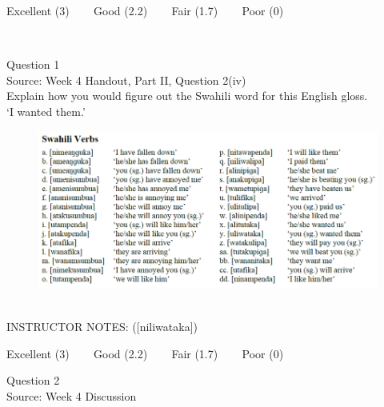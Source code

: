 \documentclass[12pt]{article}
\begin{document}
\vfill
Excellent (3) ~~~ Good (2.2) ~~~ Fair (1.7) ~~~ Poor (0)
\newpage

\begin{center}
\textbf{{\color{red}{\HUGE END OF EXAM}}}\\

\end{center}
\newpage

\begin{center}
\textbf{{\color{blue}{\HUGE START OF EXAM\\}}}

\textbf{{\color{blue}{\HUGE Student ID: 23000\\}}}

\textbf{{\color{blue}{\HUGE 9:20\\}}}

\end{center}
\newpage

{\large Question 1}\\

Source: Week 4 Handout, Part II, Question 2(iv)\\

Explain how you would figure out the Swahili word for this English gloss.\\

‘I wanted them.’

\begin{figure}[H]
\includegraphics{../images/swahiliverbs.png}
\end{figure}

~\\
INSTRUCTOR NOTES: ([niliwataka])


\vfill
Excellent (3) ~~~ Good (2.2) ~~~ Fair (1.7) ~~~ Poor (0)
\newpage

{\large Question 2}\\

Source: Week 4 Discussion\\
\end{document}
